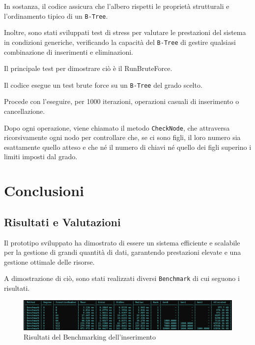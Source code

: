 \documentclass[12pt,a4paper,openright,twoside]{book}
\begin{document}
            In sostanza, il codice assicura che l'albero rispetti le proprietà strutturali e l'ordinamento tipico di un \texttt{B-Tree}.

            

            \clearpage

            Inoltre, sono stati sviluppati test di stress per valutare le prestazioni del sistema in condizioni generiche, verificando la capacità del \texttt{B-Tree} di gestire qualsiasi combinazione di inserimenti e eliminazioni.

            Il principale test per dimostrare ciò è il RunBruteForce.

            

            Il codice esegue un test brute force su un \texttt{B-Tree} del grado scelto.

            Procede con l'eseguire, per 1000 iterazioni, operazioni casuali di inserimento o cancellazione.

            Dopo ogni operazione, viene chiamato il metodo \texttt{CheckNode}, che attraversa ricorsivamente ogni nodo per controllare che, se ci sono figli, il loro numero sia esattamente quello atteso e che né il numero di chiavi né quello dei figli superino i limiti imposti dal grado.

\chapter{Conclusioni}

    \section{Risultati e Valutazioni}
        Il prototipo sviluppato ha dimostrato di essere un sistema efficiente e scalabile per la gestione di grandi quantità di dati, garantendo prestazioni elevate e una gestione ottimale delle risorse.

        A dimostrazione di ciò, sono stati realizzati diversi \texttt{Benchmark} di cui seguono i risultati.

        \begin{figure} [h]
            \centering
            \includegraphics[width=1\linewidth]{figures/BenchmarkInsertion.png}
            \caption{Risultati del Benchmarking dell'inserimento}
            \label{fig:benchmarkA}
        \end{figure}
\end{document}
